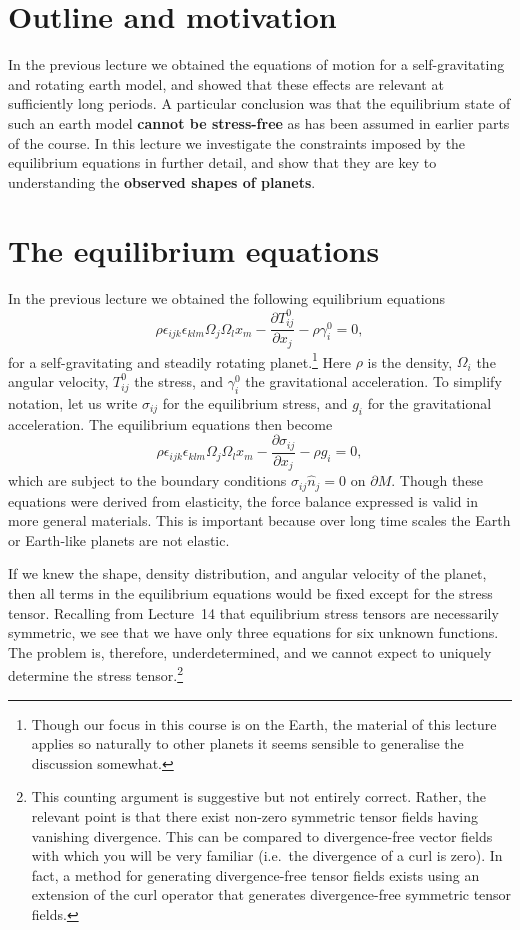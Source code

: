 \section*{Outline and motivation}
In the previous lecture we obtained the equations of motion for a self-gravitating and rotating earth model,
 and showed that these effects are relevant at sufficiently long periods. A particular conclusion was that the equilibrium 
 state of such an earth model \textbf{cannot be stress-free} as has been assumed in earlier parts of the course. 
 In this lecture we investigate the constraints imposed by the equilibrium equations in further detail, and show that they are 
 key to understanding the \textbf{observed shapes of planets}.

\section*{The equilibrium equations}
In the previous lecture we obtained the following equilibrium equations
\begin{equation}
\rho\epsilon_{ijk}\epsilon_{klm}\Omega_{j}\Omega_{l}x_{m}-\frac{\partial T_{ij}^{0}}{\partial x_{j}}-\rho\gamma_{i}^{0}=0,
\label{eq:1}
\end{equation}
for a self-gravitating and steadily rotating planet.\footnote{Though our focus in this course is on the Earth, the material of this 
lecture applies so naturally to other planets it seems sensible to generalise the discussion somewhat.} Here $\rho$ is the 
density, $\Omega_{i}$ the angular velocity, $T_{ij}^{0}$ the stress, and $\gamma_{i}^{0}$ the gravitational acceleration. To 
simplify notation, let us write $\sigma_{ij}$ for the equilibrium stress, and $g_{i}$ for the gravitational acceleration. 
The equilibrium equations then become
\begin{equation}
\rho\epsilon_{ijk}\epsilon_{klm}\Omega_{j}\Omega_{l}x_{m}-\frac{\partial\sigma_{ij}}{\partial x_{j}}-\rho g_{i}=0,
\label{eq:2}
\end{equation}
which are subject to the boundary conditions $\sigma_{ij}\hat{n}_{j}=0$ on $\partial M$. Though these equations were 
derived from elasticity, the force balance expressed is valid in more general materials. This is important because over 
long time scales the Earth or Earth-like planets are not elastic.

If we knew the shape, density distribution, and angular velocity of the planet, then all terms in the equilibrium equations would be 
fixed except for the stress tensor. Recalling from Lecture~14 that equilibrium stress tensors are necessarily symmetric, we 
see that we have only three equations for six unknown functions. The problem is, therefore, underdetermined, and we cannot expect 
to uniquely determine the stress tensor.\footnote{This counting argument is suggestive but not entirely correct. Rather, the relevant 
point is that there exist non-zero symmetric tensor fields having vanishing divergence. This can be compared to divergence-free vector 
fields with which you will be very familiar (i.e.\ the divergence of a curl is zero). In fact, a method for generating divergence-free tensor 
fields exists using an extension of the curl operator that generates divergence-free symmetric tensor fields.}

